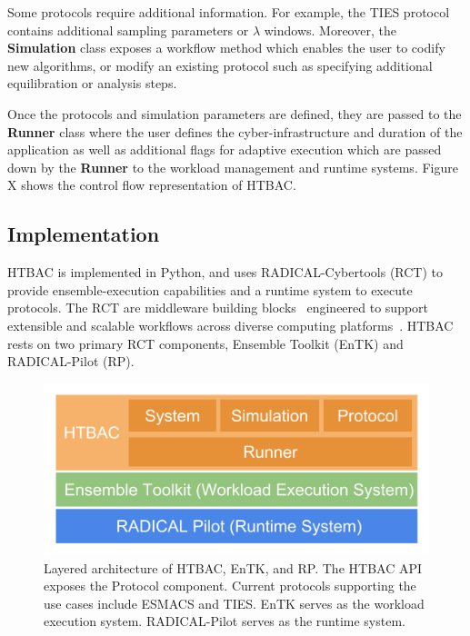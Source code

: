 Some protocols require additional information. For 
example, the TIES protocol contains additional sampling parameters or   
$\lambda$ windows. Moreover, the \textbf{Simulation} class exposes a 
workflow method which enables the user to codify new algorithms, or modify
an existing protocol such as specifying additional equilibration or analysis 
steps. 

Once the protocols and simulation parameters 
are defined, they are passed to the \textbf{Runner} class where the user defines 
the cyber-infrastructure and duration of the application as well as additional 
flags for adaptive execution which are passed down by the \textbf{Runner} to the 
workload management and runtime systems. Figure X shows the control flow 
representation of HTBAC. 



\subsection{Implementation}

HTBAC is implemented in Python, and uses RADICAL-Cybertools (RCT) to provide 
ensemble-execution capabilities and a runtime system to execute protocols. 
The RCT are middleware building blocks~\cite{review_bb_2016} engineered to 
support extensible and scalable workflows across diverse computing
platforms~\cite{turilli2017comprehensive}. HTBAC rests on two primary RCT 
components, Ensemble Toolkit (EnTK) and RADICAL-Pilot (RP). 

\begin{figure}
  \centering
   \includegraphics[width=\columnwidth]{figures/htbac_workflow.png}
  \caption{Layered architecture of HTBAC, EnTK, and RP. The HTBAC API exposes 
  the Protocol component. Current protocols supporting the use cases include 
  ESMACS and TIES. EnTK serves as the workload execution system. RADICAL-Pilot 
  serves as the runtime system.}
\label{fig:blockdiagram}
\end{figure}

